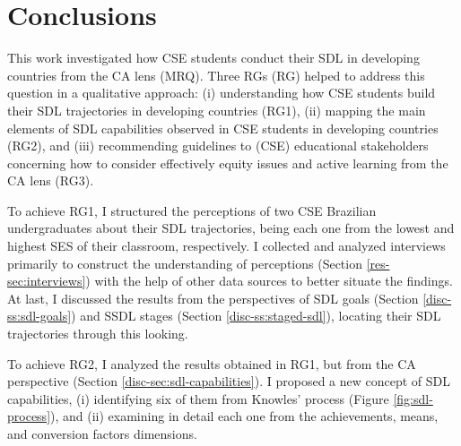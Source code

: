 \chapter{Conclusions}
\label{chap:final-remarks}

 This work investigated how \acrfull{CSE} students conduct their \acrfull{SDL} in developing countries from the \acrfull{CA} lens (\acrfull{MRQ}). Three \acrlong{RG}s (\acrshort{RG}) helped to address this question in a qualitative approach: (i) understanding how \gls{CSE} students build their \gls{SDL} trajectories in developing countries (\gls{RG}1), (ii) mapping the main elements of \gls{SDL} capabilities observed in \gls{CSE} students in developing countries (\gls{RG}2), and (iii) recommending guidelines to (\gls{CSE}) educational stakeholders concerning how to consider effectively equity issues and active learning from the \gls{CA} lens (\gls{RG}3).

To achieve \gls{RG}1, I structured the perceptions of two \gls{CSE} Brazilian undergraduates about their \gls{SDL} trajectories, being each one from the lowest and highest \gls{SES} of their classroom, respectively. I collected and analyzed interviews primarily to construct the understanding of perceptions (Section \ref{res-sec:interviews}) with the help of other data sources to better situate the findings. At last, I discussed the results from the perspectives of \gls{SDL} goals (Section \ref{disc-ss:sdl-goals}) and \acrfull{SSDL} stages (Section \ref{disc-ss:staged-sdl}), locating their \gls{SDL} trajectories through this looking. 

To achieve \gls{RG}2, I analyzed the results obtained in \gls{RG}1, but from the \gls{CA} perspective (Section \ref{disc-sec:sdl-capabilities}). I proposed a new concept of \gls{SDL} capabilities, (i) identifying six of them from Knowles' process (Figure \ref{fig:sdl-process}), and (ii) examining in detail each one from the achievements, means, and conversion factors dimensions.

